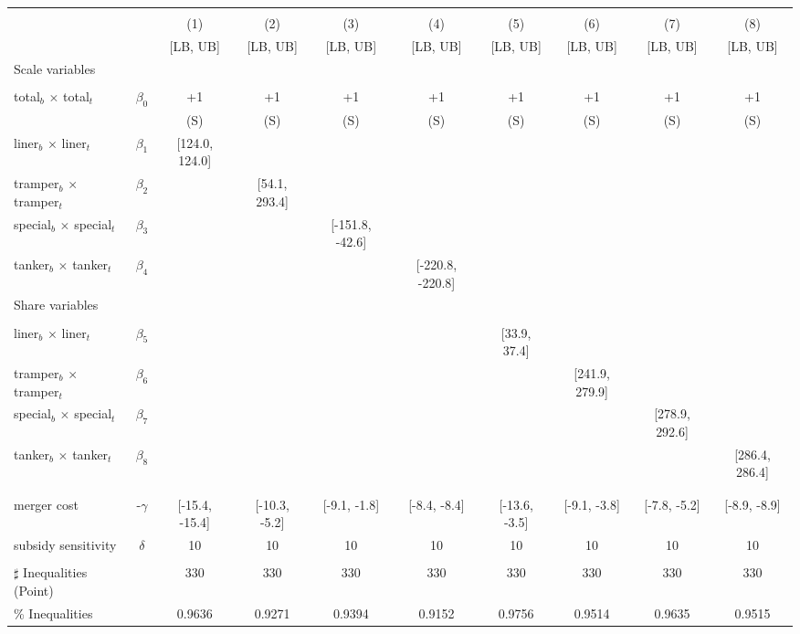 \begin{tabular}{@{\extracolsep{5pt}}lccccccccc}
\toprule 
 &  &  &  &  &  &  &  &  &  \\
 &  & (1) & (2) & (3) & (4) & (5) & (6) & (7) & (8) \\
 &  & [LB, UB] & [LB, UB] & [LB, UB] & [LB, UB] & [LB, UB] & [LB, UB] & [LB, UB] & [LB, UB] \\
\midrule 
Scale variables &  &  &  &  &  &  &  \\
 &  &  &  &  &  &  &  &  \\
total$_{b}$ $\times$ total$_{t}$ & $\beta_0$ & +1 & +1 & +1 & +1 & +1 & +1 & +1 & +1 \\
 &  & (S) & (S) & (S) & (S) & (S) & (S) & (S) & (S) \\
liner$_{b}$ $\times$ liner$_{t}$ & $\beta_1$ & [124.0, 124.0] &  &  &  &  &  &  &  \\
tramper$_{b}$ $\times$ tramper$_{t}$ & $\beta_2$ &  & [54.1, 293.4] &  &  &  &  &  &  \\
special$_{b}$ $\times$ special$_{t}$ & $\beta_3$ &  &  & [-151.8, -42.6] &  &  &  &  &  \\
tanker$_{b}$ $\times$ tanker$_{t}$ & $\beta_4$ &  &  &  & [-220.8, -220.8] &  &  &  &  \\
Share variables &  &  &  &  &  &  &  &  &  \\
 &  &  &  &  &  &  &  &  &  \\
liner$_{b}$ $\times$ liner$_{t}$ & $\beta_5$ &  &  &  &  & [33.9, 37.4] &  &  &  \\
tramper$_{b}$ $\times$ tramper$_{t}$ & $\beta_6$ &  &  &  &  &  & [241.9, 279.9] &  &  \\
special$_{b}$ $\times$ special$_{t}$ & $\beta_7$ &  &  &  &  &  &  & [278.9, 292.6] &  \\
tanker$_{b}$ $\times$ tanker$_{t}$ & $\beta_8$ &  &  &  &  &  &  &  & [286.4, 286.4] \\
 &  &  &  &  &  &  &  &  &  \\
 &  &  &  &  &  &  &  &  &  \\
merger cost & -$\gamma$ & [-15.4, -15.4] & [-10.3, -5.2] & [-9.1, -1.8] & [-8.4, -8.4] & [-13.6, -3.5] & [-9.1, -3.8] & [-7.8, -5.2] & [-8.9, -8.9] \\
subsidy sensitivity & $\delta$ & 10 & 10 & 10 & 10 & 10 & 10 & 10 & 10 \\
 &  &  &  &  &  &  &  &  &  \\
\hline 
$\sharp$ Inequalities (Point) &  & 330 & 330 & 330 & 330 & 330 & 330 & 330 & 330 \\
\% Inequalities &  & 0.9636 & 0.9271 & 0.9394 & 0.9152 & 0.9756 & 0.9514 & 0.9635 & 0.9515 \\
\bottomrule 
\end{tabular}
